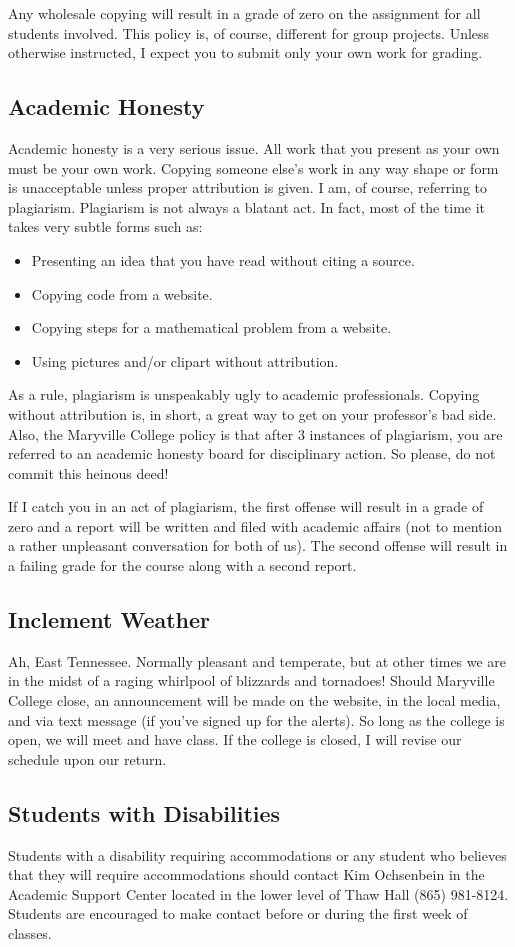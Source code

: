 \documentclass[11pt]{article}
\begin{document}
Any wholesale copying will result in a grade of zero on the assignment for all students involved. This policy is, of course, different for group projects. Unless otherwise instructed, I expect you to submit only your own work for grading.

\subsection*{Academic Honesty}
Academic honesty is a very serious issue. All work that you present as
your own must be your own work. Copying someone else's work in any
way shape or form is unacceptable unless proper attribution is given.
I am, of course, referring to plagiarism. Plagiarism is not always
a blatant act. In fact, most of the time it takes very subtle forms
such as:

\begin{itemize}
\item Presenting an idea that you have read without citing a source.
\item Copying code from a website.
\item Copying steps for a mathematical problem from a website.
\item Using pictures and/or clipart without attribution.
\end{itemize}

As a rule, plagiarism is unspeakably ugly to academic professionals.
Copying without attribution is, in short, a great way to get on your
professor's bad side. Also, the Maryville College policy is that
after 3 instances of plagiarism, you are referred to an academic
honesty board for disciplinary action. So please, do not commit this
heinous deed!

If I catch you in an act of plagiarism, the first offense will result
in a grade of zero and a report will be written and filed with
academic affairs (not to mention a rather unpleasant conversation for
both of us). The second offense will result in a failing grade for the
course along with a second report.

\subsection*{Inclement Weather}
Ah, East Tennessee. Normally pleasant and temperate, but at other
times we are in the midst of a raging whirlpool of blizzards and
tornadoes! Should Maryville College close, an announcement will be
made on the website, in the local media, and via text message (if
you've signed up for the alerts). So long as the college is open,
we will meet and have class. If the college is closed, I will revise
our schedule upon our return.

\subsection*{Students with Disabilities}
Students with a disability requiring accommodations or any student who
believes that they will require accommodations should contact Kim
Ochsenbein in the Academic Support Center located in the lower level
of Thaw Hall (865) 981-8124. Students are encouraged to make contact
before or during the first week of classes.
\end{document}
